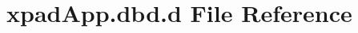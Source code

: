 \hypertarget{xpadApp_8dbd_8d}{\section{xpad\-App.\-dbd.\-d \-File \-Reference}
\label{xpadApp_8dbd_8d}
}
